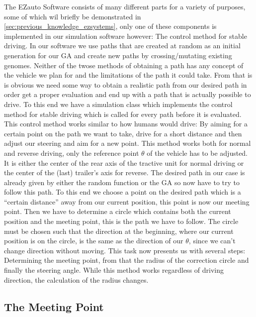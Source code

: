 The EZauto Software consists of many different parts for a variety of purposes, some of which wil briefly be demonstrated in \ref{sec:previous_knowledge_ezsystems}, only one of these components is implemented in our simulation software however: The control method for stable driving. \cite{12}
In our software we use paths that are created at random as an initial generation for our GA and create new paths by crossing/mutating existing genomes. Neither of the twose methods of obtaining a path has any concept of the vehicle we plan for and the limitations of the path it could take. From that is is obvious we need some way to obtain a realistic path from our desired path in order get a proper evaluation and end up with a path that is actually possible to drive. To this end we have a simulation class which implements the control method for stable driving which is called for every path before it is evaluated. This control method works similar to how humans would drive: By aiming for a certain point on the path we want to take, drive for a short distance and then adjust our steering and aim for a new point. \cite{31,32} This method works both for normal and reverse driving, only the reference point $\theta$ of the vehicle has to be adjusted. It is either the center of the rear axis of the tractive unit for normal driving or the center of the (last) trailer's axis for reverse. 
The desired path in our case is already given by either the random function or the GA so now have to try to follow this path. To this end we choose a point on the desired path which is a "`certain distance"' away from our current position, this point is now our meeting point. Then we have to determine a circle which contains both the current position and the meeting point, this is the path we have to follow. The circle must be chosen such that the direction at the beginning, where our current position is on the circle, is the same as the direction of our $\theta$, since we can't change direction without moving.
This task now presents us with several steps: Determining the meeting point, from that the radius of the correction circle and finally the steering angle. While this method works regardless of driving direction, the calculation of the radius changes.

\subsection{The Meeting Point}
\label{sec:meeting_point}

